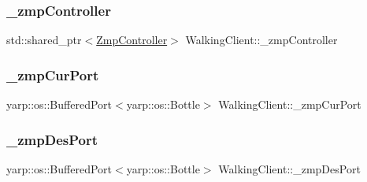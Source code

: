 \hypertarget{classWalkingClient_afc6a0ac97a4c3f83e27879e803fab8f6}{}\label{classWalkingClient_afc6a0ac97a4c3f83e27879e803fab8f6} 
\subsubsection{\texorpdfstring{\+\_\+zmp\+Controller}{\_zmpController}}
{\footnotesize\ttfamily std\+::shared\+\_\+ptr$<$\hyperlink{classZmpController}{Zmp\+Controller}$>$ Walking\+Client\+::\+\_\+zmp\+Controller\hspace{0.3cm}{\ttfamily [private]}}

\hypertarget{classWalkingClient_a546e6830e43d19ba7d8a8e808e28ef53}{}\label{classWalkingClient_a546e6830e43d19ba7d8a8e808e28ef53} 
\subsubsection{\texorpdfstring{\+\_\+zmp\+Cur\+Port}{\_zmpCurPort}}
{\footnotesize\ttfamily yarp\+::os\+::\+Buffered\+Port$<$yarp\+::os\+::\+Bottle$>$ Walking\+Client\+::\+\_\+zmp\+Cur\+Port\hspace{0.3cm}{\ttfamily [private]}}

\hypertarget{classWalkingClient_acbac3e142471448b50dd605e4217b0d0}{}\label{classWalkingClient_acbac3e142471448b50dd605e4217b0d0} 
\subsubsection{\texorpdfstring{\+\_\+zmp\+Des\+Port}{\_zmpDesPort}}
{\footnotesize\ttfamily yarp\+::os\+::\+Buffered\+Port$<$yarp\+::os\+::\+Bottle$>$ Walking\+Client\+::\+\_\+zmp\+Des\+Port\hspace{0.3cm}{\ttfamily [private]}}

\hypertarget{classWalkingClient_a20012b4bee7f6de8177ed53907f894cb}{}\label{classWalkingClient_a20012b4bee7f6de8177ed53907f894cb} 
